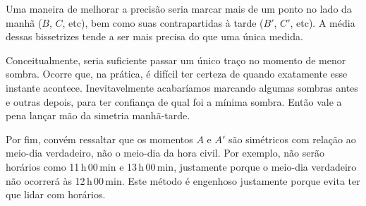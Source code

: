 Uma maneira de melhorar a precisão seria marcar mais de um ponto no lado da manhã ($B$, $C$, etc), bem como suas contrapartidas à tarde ($B'$, $C'$, etc). A média dessas bissetrizes tende a ser mais precisa do que uma única medida.

Conceitualmente, seria suficiente passar um único traço no momento de menor sombra. Ocorre que, na prática, é difícil ter certeza de quando exatamente esse instante acontece. Inevitavelmente acabaríamos marcando algumas sombras antes e outras depois, para ter confiança de qual foi a mínima sombra. Então vale a pena lançar mão da simetria manhã-tarde.

Por fim, convém ressaltar que os momentos $A$ e $A'$ são simétricos com relação ao meio-dia verdadeiro, não o meio-dia da hora civil. Por exemplo, não serão horários como 11\,h\,00\,min e 13\,h\,00\,min, justamente porque o meio-dia verdadeiro não ocorrerá às 12\,h\,00\,min. Este método é engenhoso justamente porque evita ter que lidar com horários.


